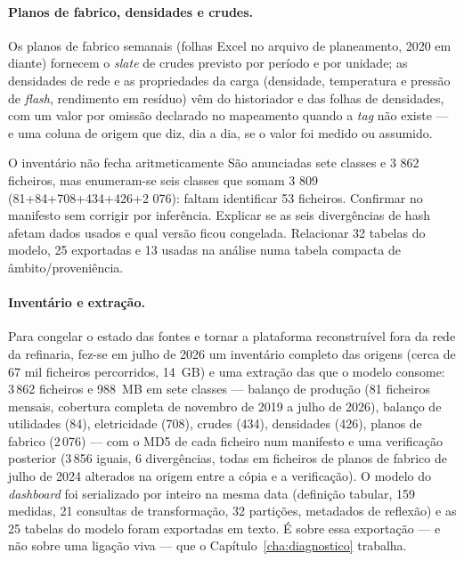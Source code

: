 \paragraph{Planos de fabrico, densidades e crudes.} Os planos de fabrico
semanais (folhas Excel no arquivo de planeamento, 2020 em diante)
fornecem o \emph{slate} de crudes previsto por período e por unidade; as
densidades de rede e as propriedades da carga (densidade, temperatura e
pressão de \emph{flash}, rendimento em resíduo) vêm do historiador e das
folhas de densidades, com um valor por omissão declarado no mapeamento
quando a \emph{tag} não existe --- e uma coluna de origem que diz, dia a
dia, se o valor foi medido ou assumido.

{O inventário não fecha aritmeticamente}
{São anunciadas sete classes e 3 862 ficheiros, mas enumeram-se seis
classes que somam 3 809 (81+84+708+434+426+2 076): faltam identificar
53 ficheiros. Confirmar no manifesto sem corrigir por inferência.
Explicar se as seis divergências de hash afetam dados usados e qual
versão ficou congelada. Relacionar 32 tabelas do modelo, 25 exportadas
e 13 usadas na análise numa tabela compacta de âmbito/proveniência.}%
\paragraph{Inventário e extração.} Para congelar o estado das fontes e
tornar a plataforma reconstruível fora da rede da refinaria, fez-se em
julho de 2026 um inventário completo das origens (cerca de 67 mil ficheiros
percorridos, 14~GB) e uma extração das que o modelo consome: 3\,862
ficheiros e 988~MB em sete classes --- balanço de produção (81 ficheiros
mensais, cobertura completa de novembro de 2019 a julho de 2026), balanço
de utilidades (84), eletricidade (708), crudes (434), densidades (426),
planos de fabrico (2\,076) --- com o MD5 de cada ficheiro num manifesto e
uma verificação posterior (3\,856 iguais, 6 divergências, todas em
ficheiros de planos de fabrico de julho de 2024 alterados na origem entre a
cópia e a verificação).
O modelo do \emph{dashboard} foi serializado por inteiro na mesma data
(definição tabular, 159 medidas, 21 consultas de transformação, 32
partições, metadados de reflexão) e as 25 tabelas do modelo foram
exportadas em texto. É sobre essa exportação --- e não sobre uma ligação
viva --- que o Capítulo~\ref{cha:diagnostico} trabalha.

